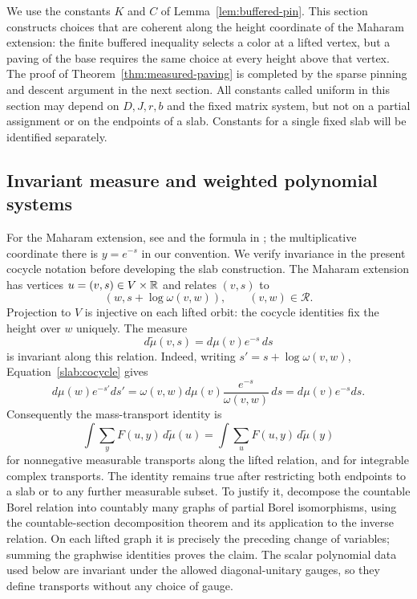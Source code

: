 We use the constants $K$ and $C$ of Lemma~\ref{lem:buffered-pin}.
This section constructs choices that are coherent along the height
coordinate of the Maharam extension: the finite buffered inequality
selects a color at a lifted vertex, but a paving of the base requires
the same choice at every height above that vertex. The proof of
Theorem~\ref{thm:measured-paving} is completed by the sparse pinning and
descent argument in the next section. All constants called uniform in
this section may depend on $D,J,r,b$ and the fixed matrix system, but
not on a partial assignment or on the endpoints of a slab. Constants
for a single fixed slab will be identified separately.

\subsection{Invariant measure and weighted polynomial systems}

For the Maharam extension, see \cite{Maharam64} and the formula in
\cite[Section~2, before Theorem~2.1]{RoySamorodnitsky06}; the multiplicative
coordinate there is $y=e^{-s}$ in our convention. We verify invariance
in the present cocycle notation before developing the slab construction.
The Maharam extension has vertices
$u=(v,s)\in V\times\mathbb R$ and relates
$(v,s)$ to
\[
 (w,s+\log\omega(v,w)),\qquad (v,w)\in\mathcal R.
\]
Projection to $V$ is injective on each lifted orbit: the cocycle
identities fix the height over $w$ uniquely. The measure
\[
 d\widetilde\mu(v,s)=d\mu(v)e^{-s}\,ds
\]
is invariant along this relation. Indeed, writing
$s'=s+\log\omega(v,w)$, Equation~\eqref{slab:cocycle} gives
\[
 d\mu(w)e^{-s'}ds'=\omega(v,w)d\mu(v)
       \frac{e^{-s}}{\omega(v,w)}\,ds=d\mu(v)e^{-s}ds.
\]
Consequently the mass-transport identity is
\begin{equation}
 \int \sum_y F(u,y)\,d\widetilde\mu(u)
 =\int \sum_u F(u,y)\,d\widetilde\mu(y)
 \label{slab:mass-transport}
\end{equation}
for nonnegative measurable transports along the lifted relation, and
for integrable complex transports. The identity remains true after
restricting both endpoints to a slab or to any further measurable
subset. To justify it, decompose the countable Borel relation into
countably many graphs of partial Borel isomorphisms, using the
countable-section decomposition theorem and its application to the
inverse relation. On each lifted graph it is precisely the preceding
change of variables; summing the graphwise identities proves the
claim. The scalar polynomial data used below are invariant under the
allowed diagonal-unitary gauges, so they define transports without any
choice of gauge.

